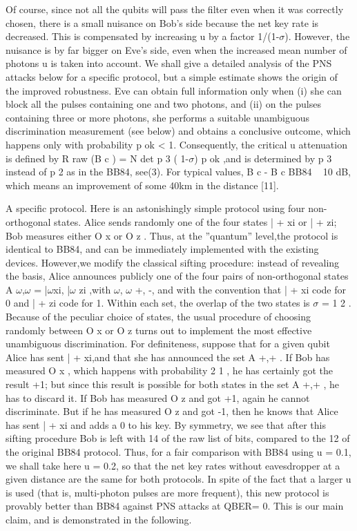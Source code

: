 Of course, since not all the qubits will pass the filter even when it was correctly chosen, there is a small nuisance on Bob’s side because the net key rate is decreased. This is compensated by increasing u by a factor 1/(1-$\sigma$).
However, the nuisance is by far bigger on Eve’s side, even when the increased mean number of photons u is taken into account. We shall give a detailed analysis of the PNS attacks below for a specific protocol, but a simple estimate shows the origin of the improved robustness. Eve can obtain full information only when (i) she can block all the pulses containing one and two photons, and (ii) on the pulses containing three or more photons, she performs a suitable unambiguous discrimination measurement (see below) and obtains a conclusive outcome, which happens only with probability p ok < 1. Consequently, the critical u attenuation is defined by R raw (B c ) = N det p 3 ( 1-$\sigma$) p ok ,and is determined by p 3 instead of p 2 as in the BB84, see(3). For typical values, B c - B c BB84 ~ 10 dB, which means an improvement of some 40km in the distance [11].

A specific protocol. Here is an astonishingly simple protocol using four non-orthogonal states. Alice sends randomly one of the four states | + xi or | + zi; Bob measures either O x or O z . Thus, at the ”quantum” level,the protocol is identical to BB84, and can be immediately implemented with the existing devices. However,we modify the classical sifting procedure: instead of revealing the basis, Alice announces publicly one of the four pairs of non-orthogonal states A $\omega$,$\omega$  = |$\omega$xi, |$\omega$  zi ,with $\omega$, $\omega$ {+, -}, and with the convention that | + xi code for 0 and | + zi code for 1. Within each set, the overlap of the two states is $\sigma$ =  1 2 . Because of the peculiar choice of states, the usual procedure of choosing randomly between O x or O z turns out to implement the most effective unambiguous discrimination. For definiteness, suppose that for a given qubit Alice has sent | + xi,and that she has announced the set A +,+ . If Bob has measured O x , which happens with probability 2 1 , he has certainly got the result +1; but since this result is possible for both states in the set A +,+ , he has to discard it.
If Bob has measured O z and got +1, again he cannot discriminate. But if he has measured O z and got -1, then he knows that Alice has sent | + xi and adds a 0 to his key.
By symmetry, we see that after this sifting procedure Bob is left with 14 of the raw list of bits, compared to the 12 of the original BB84 protocol. Thus, for a fair comparison with BB84 using u = 0.1, we shall take here u = 0.2, so that the net key rates without eavesdropper at a given distance are the same for both protocols. In spite of the fact that a larger u is used (that is, multi-photon pulses are more frequent), this new protocol is provably better than BB84 against PNS attacks at QBER= 0. This is our main claim, and is demonstrated in the following.

